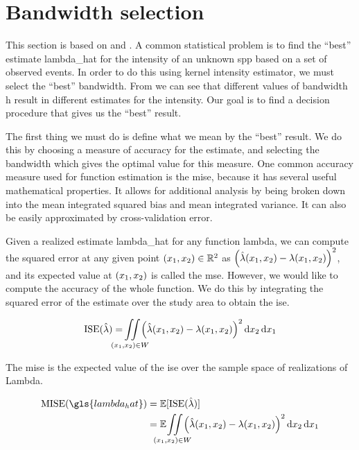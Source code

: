 \section{Bandwidth selection}
\label{sec:theory:bandwidth}

This section is based on \citet{silverman1986density} and \citet{wand1994kernel}.
A common statistical problem is to find the ``best'' estimate \gls{lambda_hat}
for the \gls{intensity} of an unknown \gls{spp}
based on a set of observed \glspl{event}.
In order to do this using \gls{kernel intensity estimator},
we must select the ``best'' bandwidth.
From  we can see that different values of bandwidth \gls{h} result in different estimates for the \gls{intensity}.
Our goal is to find a decision procedure that gives us the ``best'' result.

The first thing we must do is define what we mean by the ``best'' result.
We do this by choosing a measure of accuracy for the estimate,
and selecting the bandwidth which gives the optimal value for this measure.
One common accuracy measure used for function estimation is the \gls{mise},
because it has several useful mathematical properties.
It allows for additional analysis by being broken down into the mean integrated squared bias and mean integrated variance.
It can also be easily approximated by cross-validation error.

Given a realized estimate \gls{lambda_hat} for any function \gls{lambda},
we can compute the squared error at any given point $(x_1, x_2) \in \mathbb{R}^2$ as
$\left( \hat{\lambda}(x_1, x_2) - \lambda(x_1, x_2) \right)^2$,
and its expected value at $(x_1, x_2)$ is called the \gls{mse}.
However,
we would like to compute the accuracy of the whole function.
We do this by integrating the squared error of the estimate over the study area to obtain the \gls{ise}.

\begin{equation}
\label{eq:ise}
    \mbox{ISE}(\hat{\lambda}) = \iintW{
            \left( \hat{\lambda}\xvec - \lambda\xvec \right)^2
        }
\end{equation}

The \gls{mise} is the expected value of the \gls{ise} over the sample space of realizations of \gls{Lambda}.

\begin{align}
    \mbox{MISE}(\gls{lambda_hat}) & = \E [\mbox{ISE}(\hat{\lambda})] \nonumber \\
                & = \E \iintW{ \left( \hat{\lambda}\xvec - \lambda\xvec \right)^2 } \label{eq:mise}
\end{align}

